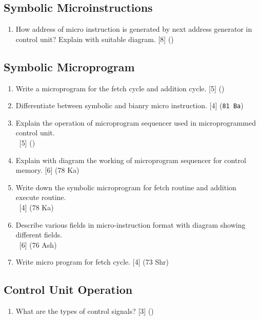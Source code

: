 \documentclass[12pt]{article}
\newcommand{\enter}{\\\textcolor{white}{1}}
\begin{document}
	\subsection{Symbolic Microinstructions}
		\begin{enumerate}[noitemsep, topsep=0pt]
			\item How address of micro instruction is generated by next address generator in control unit? Explain with suitable diagram. \hfill [8] ()
		\end{enumerate}
	
	\subsection{Symbolic Microprogram}
		\begin{enumerate}[noitemsep, topsep=0pt]
			\item Write a microprogram for the fetch cycle and addition cycle. \hfill [5] ()
			
			\item Differentiate between symbolic and bianry micro instruction. \hfill [4] (\texttt{81 Ba})
			
			\item Explain the operation of microprogram sequencer used in microprogrammed control unit. 
			\enter\hfill [5] ()
			
			\item Explain with diagram the working of microprogram sequencer for control memory. \hfill [6] (78 Ka)
			
			\item Write down the symbolic microprogram for fetch routine and addition execute routine.
			\enter\hfill [4] (78 Ka)
			
			\item Describe various fields in micro-instruction format with diagram showing different fields.
			\enter\hfill [6] (76 Ash)
			
			\item Write micro program for fetch cycle. \hfill [4] (73 Shr)
		\end{enumerate}
		
	\subsection{Control Unit Operation}
		\begin{enumerate}[noitemsep, topsep=0pt]
			\item What are the types of control signals? \hfill [3] ()
		\end{enumerate}
	
\end{document}
